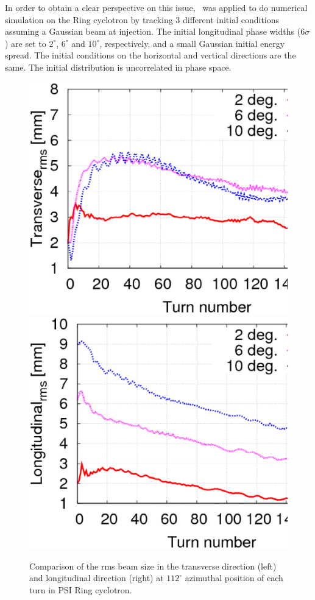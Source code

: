 \documentclass{JAC2003}
\begin{document}
In order to obtain a clear perspective on this issue, \opalcycl \  was applied to do numerical simulation on the Ring cyclotron by tracking 3
different initial conditions assuming a Gaussian beam at injection. The initial longitudinal phase widths (6$\sigma$) are set to $2^\circ$, $6^\circ$ and $10^\circ$, respectively,
and a small Gaussian initial energy spread.
The initial conditions on the horizontal and vertical directions are the same. 
The initial distribution is uncorrelated in phase space.
\begin{figure}
  \centering
  \includegraphics*[width=0.45\linewidth]{figures/Comp-Transverse.ps}
  \includegraphics*[width=0.45\linewidth]{figures/Comp-Longitudinal.ps}
  \caption{Comparison of the rms beam size in the transverse direction (left) and longitudinal direction (right) at $112^\circ$ azimuthal position of each turn 
    in PSI Ring cyclotron. }
  \label{fig:RMSsize}
\end{figure}
\end{document}
